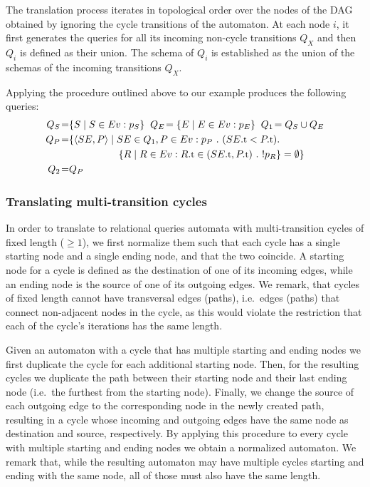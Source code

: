 The translation process iterates in topological order over the nodes of the DAG
obtained by ignoring the cycle transitions of the automaton.
At each node $i$, it first generates the queries for all its incoming
non-cycle transitions $Q_X$ and then $Q_i$ is defined as their union. 
The schema of $Q_i$ is established as the union of the schemas of the incoming 
transitions $Q_X$.

Applying the procedure outlined above to our example produces the following 
queries:
\begin{align*}
Q_S\!=& \{ S \mid S \in \Ev : p_S \}
\;\;
Q_E\!= \{ E \mid E \in \Ev : p_E \}
\;\;
Q_1\!= Q_S \cup Q_E
\\
Q_P\!=& \{ \tuple{SE,P} \mid SE \in Q_1, P \in \Ev:
p_P\ .\ (\facc{SE}{t} < \facc{P}{t}) . 
\\
& 
\qqquad\quad
\{ R \mid R \in \Ev : \facc{R}{t} \in (\facc{SE}{t}, \facc{P}{t})\ .\ 
						! p_R \} = \emptyset
 \}
\\
Q_2\!=& Q_P
\end{align*}

\subsubsection{Translating multi-transition cycles}

In order to translate to relational queries automata with multi-transition 
cycles of fixed length ($\geq 1$), we first normalize them such that each cycle
has a single starting node and a single ending node, and that the two coincide.
A starting node for a cycle is defined as the destination of one of its 
incoming edges, while an ending node is the source of one of its outgoing edges.
We remark, that cycles of fixed length cannot have transversal edges (paths), 
i.e.\ edges (paths) that connect non-adjacent nodes in the cycle, as this would 
violate the restriction that each of the cycle's iterations has the same length.


Given an automaton with a cycle that has multiple starting and ending nodes 
we first duplicate the cycle for each additional starting node. 
Then, for the resulting cycles we duplicate the path between their starting 
node and their last ending node (i.e.\ the furthest from the starting node).  
Finally, we change the source of each outgoing edge to the corresponding 
node in the newly created path, resulting in a cycle whose incoming and 
outgoing edges have the same node as destination and source, respectively.
By applying this procedure to every cycle with multiple starting and ending 
nodes we obtain a normalized automaton.  
We remark that, while the resulting automaton may have multiple cycles starting 
and ending with the same node, all of those must also have the same length.


